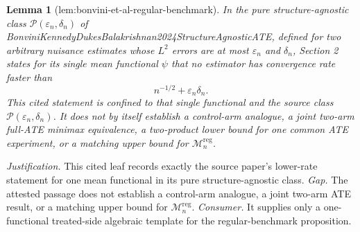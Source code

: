 \documentclass{article}
\newtheorem{lemma}{Lemma}
\begin{document}
\begin{lemma}[lem:bonvini-et-al-regular-benchmark]\label{lem:bonvini-et-al-regular-benchmark}
In the pure structure-agnostic class \(\mathcal P(\varepsilon_n,\delta_n)\) of BonviniKennedyDukesBalakrishnan2024StructureAgnosticATE, defined for two arbitrary nuisance estimates whose \(L^2\) errors are at most \(\varepsilon_n\) and \(\delta_n\), Section 2 states for its single mean functional \(\psi\) that no estimator has convergence rate faster than
\[
n^{-1/2}+\varepsilon_n\delta_n.
\]
This cited statement is confined to that single functional and the source class \(\mathcal P(\varepsilon_n,\delta_n)\). It does not by itself establish a control-arm analogue, a joint two-arm full-ATE minimax equivalence, a two-product lower bound for one common ATE experiment, or a matching upper bound for \(\mathcal M_n^{\mathrm{reg}}\).
\end{lemma}
\par\smallskip\noindent \textit{Justification.} This cited leaf records exactly the source paper's lower-rate statement for one mean functional in its pure structure-agnostic class. \textit{Gap.} The attested passage does not establish a control-arm analogue, a joint two-arm ATE result, or a matching upper bound for \(\mathcal M_n^{\mathrm{reg}}\). \textit{Consumer.} It supplies only a one-functional treated-side algebraic template for the regular-benchmark proposition.
\end{document}
